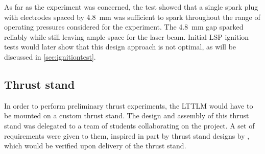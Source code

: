             As far as the experiment was concerned, the test showed that a single spark plug with electrodes spaced by 4.8~mm was sufficient to spark throughout the range of operating pressures considered for the experiment. The 4.8~mm gap sparked reliably while still leaving ample space for the laser beam. Initial LSP ignition tests would later show that this design approach is not optimal, as will be discussed in \autoref{sec:ignitiontest}.
        
        \subsection{Thrust stand}
            In order to perform preliminary thrust experiments, the LTTLM would have to be mounted on a custom thrust stand. The design and assembly of this thrust stand was delegated to a team of students collaborating on the project. A set of requirements were given to them, inspired in part by thrust stand designs by \textcite{takkenDevelopmentHightemperatureSolar2021,jansenImprovementValidationTest2016}, which would be verified upon delivery of the thrust stand. 

